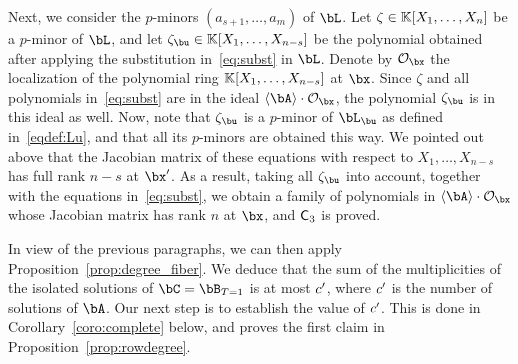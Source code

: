 \documentclass[12pt]{article}
\begin{document}
Next, we consider the $p$-minors $(a_{s+1},\dots,a_m)$ of $\bL$. Let $\zeta
\in\mathbb{K}[X_1,\dots,X_n]$ be a $p$-minor of $\bL$, and let $\zeta_\bu \in
\KK[X_1,\dots,X_{n-s}]$ be the polynomial obtained after applying the
substitution in~\eqref{eq:subst} in $\bL$. Denote by $\mathcal{O}_\bx$ the
localization of the polynomial ring $\mathbb{K}[X_1,\dots,X_{n-s}]$ at $\bx$. Since
$\zeta$ and all polynomials in~\eqref{eq:subst} are in the ideal $\langle \bA
\rangle \cdot \mathcal{O}_\bx$, the polynomial $\zeta_\bu$ is in this ideal as
well. Now, note that $\zeta_\bu$ is a $p$-minor of $\bL_\bu$ as defined
in~\eqref{eqdef:Lu}, and that all its $p$-minors are obtained this way. We
pointed out above that the Jacobian matrix of these equations with respect to
$X_1,\dots,X_{n-s}$ has full rank $n-s$ at $\bx'$. As a result, taking all
$\zeta_\bu$ into account, together with the equations in~\eqref{eq:subst}, we
obtain a family of polynomials in $\langle \bA \rangle \cdot \mathcal{O}_\bx$
whose Jacobian matrix has rank $n$ at $\bx$, and $\mathsf{C}_3$ is proved.

\medskip

In view of the previous paragraphs, we can then apply
Proposition~\ref{prop:degree_fiber}. We deduce that the sum of the
multiplicities of the isolated solutions of $\bC=\bB_{T=1}$ is at most
${c'}{}$, where ${c'}{}$ is the number of solutions of $\bA$. Our next step
is to establish the value of ${c'}{}$. This is done in
Corollary~\ref{coro:complete} below, and proves the first claim in
Proposition~\ref{prop:rowdegree}.
\end{document}
